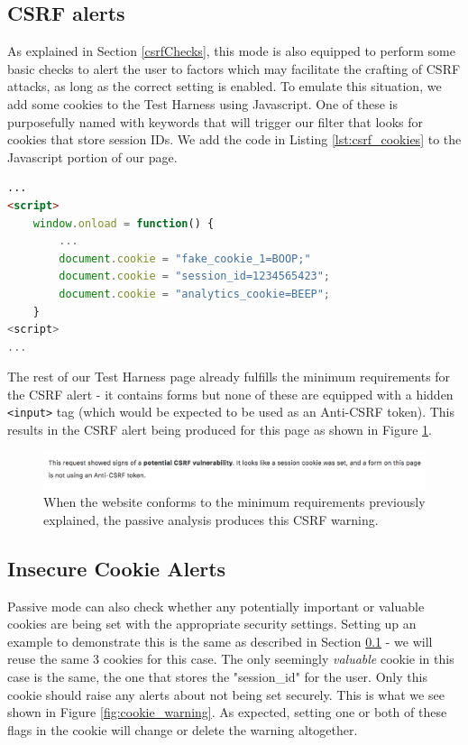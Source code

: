 \subsection{CSRF alerts} \label{applications_CSRF_alerts}

As explained in Section \ref{csrfChecks}, this mode is also equipped to perform some basic checks to alert the user to factors which may facilitate the crafting of CSRF attacks, as long as the correct setting is enabled. To emulate this situation, we add some cookies to the Test Harness using Javascript. One of these is purposefully named with keywords that will trigger our filter that looks for cookies that store session IDs. We add the code in Listing \ref{lst:csrf_cookies} to the Javascript portion of our page.

\begin{lstlisting}[label={lst:csrf_cookies}, language={HTML}, caption={We add some cookies to the page - one of these is designed to trigger our filter to find Session ID related cookies}]
...
<script>
	window.onload = function() {
		...
		document.cookie = "fake_cookie_1=BOOP;"
		document.cookie = "session_id=1234565423";
		document.cookie = "analytics_cookie=BEEP";
	}
<script>
...
\end{lstlisting}

The rest of our Test Harness page already fulfills the minimum requirements for the CSRF alert - it contains forms but none of these are equipped with a hidden \texttt{<input>} tag (which would be expected to be used as an Anti-CSRF token). This results in the CSRF alert being produced for this page as shown in Figure \ref{fig:csrf_warning}.

\begin{figure}[h!]
	\centering
	\includegraphics[width=\textwidth]{images/csrf_warning.png}
	\caption{When the website conforms to the minimum requirements previously explained, the passive analysis produces this CSRF warning.}
	\label{fig:csrf_warning}
\end{figure}

\subsection{Insecure Cookie Alerts}

Passive mode can also check whether any potentially important or valuable cookies are being set with the appropriate security settings. Setting up an example to demonstrate this is the same as described in Section \ref{applications_CSRF_alerts} - we will reuse the same 3 cookies for this case. The only seemingly \textit{valuable} cookie in this case is the same, the one that stores the "session\_id" for the user. Only this cookie should raise any alerts about not being set securely. This is what we see shown in Figure \ref{fig:cookie_warning}. As expected, setting one or both of these flags in the cookie will change or delete the warning altogether.  \\

